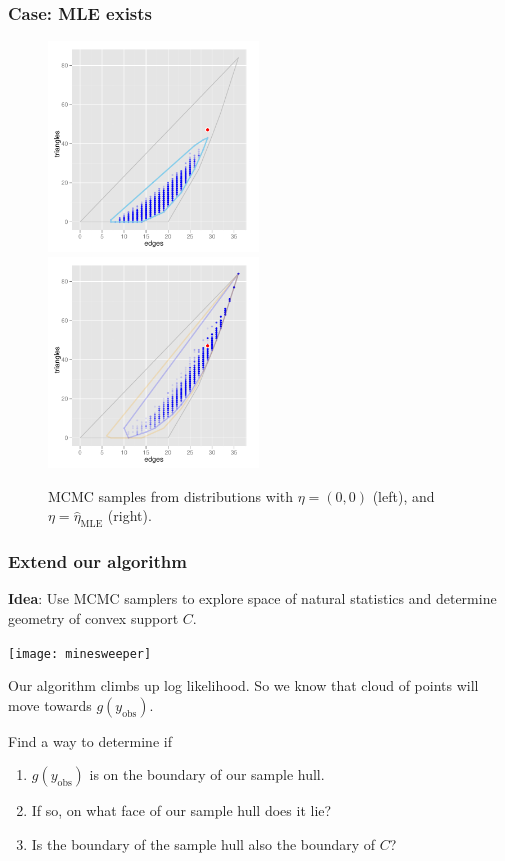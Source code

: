 \documentclass[slidestop,compress, 10pt]{beamer}
\newcommand{\etaMLE}{\hat{\eta}_{\textrm{MLE}}}
\newcommand{\yobs}{y_{\text{obs}}}
\begin{document}
\frame
{
\frametitle{Case: MLE exists}  
\begin{figure}[h]
\centering
\includegraphics[height=2.2in]{MCsample-far}
\includegraphics[height=2.2in]{MCsample-MLE}
\caption{MCMC samples from distributions with $\eta = (0,0)$ (left), and $\eta=\etaMLE$ (right).}
\label{F:MCsample-MLE exists}
\end{figure}
}


\frame
{
\frametitle{Extend our algorithm}  
\textbf{Idea}: Use MCMC samplers to explore space of natural statistics and
determine geometry of convex support $C$.
\vspace{2mm}
\pause

\texttt{[image: minesweeper]}
\vspace{2mm}

\pause
Our algorithm climbs up log likelihood.  So we know that cloud of points will move towards $g(\yobs)$.
\vspace{2mm}
\pause

Find a way to determine if
\begin{enumerate}
\item $g(\yobs)$ is on the boundary of our sample hull.
\item If so, on what face of our sample hull does it lie?
\item Is the boundary of the sample hull also the boundary of $C$?
\end{enumerate}
}
\end{document}
